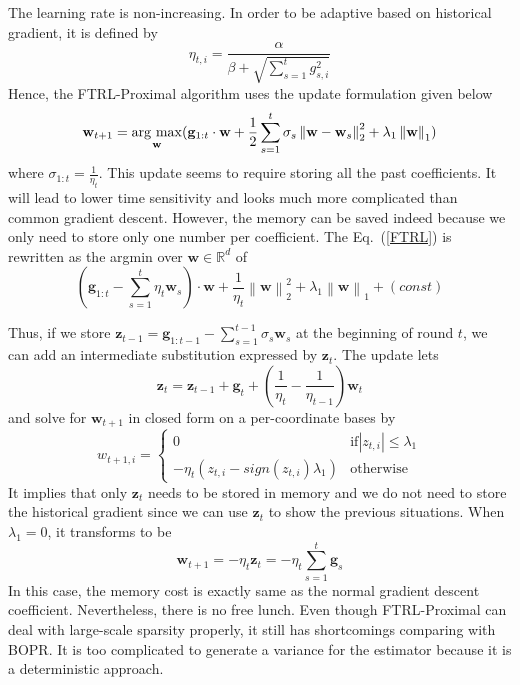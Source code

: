 The learning rate is non-increasing. In order to be adaptive based on historical gradient, it is defined by
\begin{equation}
\eta _{t,i}=\frac{\alpha}{\beta + \sqrt{\sum_{s=1}^{t}g_{s,i}^{2}}}
\end{equation}
Hence, the FTRL-Proximal algorithm uses the update formulation given below
\begin{equation}
\label{FTRL}
\mathbf{w}_{t+1}=\underset{\mathbf{w}}{\mathop{\rm arg~max}\limits} (\mathbf{g}_{1:t} \cdot \mathbf{w} + \frac{1}{2}\sum_{s=1}^{t}\sigma_{s}\left \|\mathbf{w}-\mathbf{w}_s  \right \|_{2}^{2}+\lambda_{1}\left \|\mathbf{w}  \right \|_{1})
\end{equation}
where $\sigma_{1:t}=\frac{1}{\eta _{t}}$. This update seems to require storing all the past coefficients. It will lead to lower time sensitivity and looks much more complicated than common gradient descent. However, the memory can be saved indeed because we only need to store only one number per coefficient. The Eq.~(\ref{FTRL}) is rewritten as the argmin over $\mathbf{w} \in \mathbb{R}^{d}$ of
\begin{equation}
(\mathbf{g}_{1:t}-\sum_{s=1}^{t}\eta _{t}\mathbf{w}_{s})\cdot \mathbf{w}+\frac{1}{\eta _{t}}\left \|\mathbf{w} \right \|_{2}^{2}+ \lambda _{1} \left \|\mathbf{w}  \right \|_{1}+(const)
\end{equation}

Thus, if we store $\mathbf{z}_{t-1}=\mathbf{g}_{1:t-1}-\sum_{s=1}^{t-1}\sigma_{s}\mathbf{w}_{s}$ at the beginning of round $t$, we can add an intermediate substitution expressed by $\mathbf{z}_{t}$. The update lets
\begin{equation}
\mathbf{z}_{t}=\mathbf{z}_{t-1}+\mathbf{g}_{t}+(\frac{1}{\eta_t}-\frac{1}{\eta_{t-1}})\mathbf{w}_{t}
\end{equation}
and solve for $\mathbf{w}_{t+1}$ in closed form on a per-coordinate bases by
\begin{equation}
w_{t+1,i}=\left\{\begin{matrix}
0 &\mathrm{if } |z_{t,i}| \leq \lambda_{1} \\ 
 -\eta_t(z_{t,i}-sign(z_{t,i})\lambda_1) & \mathrm{otherwise}
\end{matrix}\right.
\end{equation}
It implies that only $\mathbf{z}_t$ needs to be stored in memory and we do not need to store the historical gradient since we can use $\mathbf{z}_t$ to show the previous situations. When $\lambda_1=0$, it transforms to be 
\begin{equation}
\mathbf{w}_{t+1} = -\eta_t \mathbf{z}_{t}=-\eta_t \sum_{s=1}^{t}\mathbf{g}_s
\end{equation}
In this case, the memory cost is exactly same as the normal gradient descent coefficient. Nevertheless, there is no free lunch. Even though FTRL-Proximal can deal with large-scale sparsity properly, it still has shortcomings comparing with BOPR. It is too complicated to generate a variance for the estimator because it is a deterministic approach.

